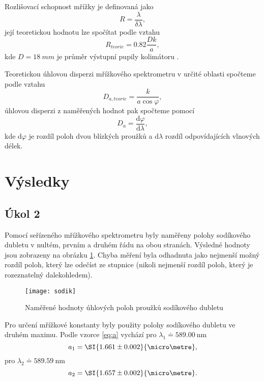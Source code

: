 \documentclass{protokol}
\begin{document}
    Rozlišovací schopnost mřížky je definovaná jako 
    \begin{equation}
      R = \frac{\lambda}{\delta \lambda},
    \end{equation}
    její teoretickou hodnotu lze spočítat podle vztahu
    \begin{equation} \label{eq:R_teorie}
      R_{teorie} = \num{0.82} \frac{D k}{a},
    \end{equation}
    kde $D = \SI{18}{mm}$ je průměr výstupní pupily kolimátoru \cite{pokyny}.

    Teoretickou úhlovou disperzi mřížkového spektrometru v určité oblasti spočteme podle vztahu
    \begin{equation} \label{eq:disperze_teorie}
      D_{a, teorie} = \frac{k}{a \cos \varphi},
    \end{equation}
    úhlovou disperzi z naměřených hodnot pak spočteme pomocí
    \begin{equation} \label{eq:disperze}
      D_a = \frac{\mathrm{d}\varphi}{\mathrm{d}\lambda},
    \end{equation}
    kde $\mathrm{d}\varphi$ je rozdíl poloh dvou blízkých proužků a $\mathrm{d}\lambda$ rozdíl odpovídajících vlnových délek.

  \section*{Výsledky}

    \subsection*{Úkol 2}

      Pomocí seřízeného mřížkového spektrometru byly naměřeny polohy sodíkového dubletu v nultém, prvním a druhém řádu na obou stranách. Výsledné hodnoty jsou zobrazeny na obrázku \ref{fig:sodik}. Chyba měření byla odhadnuta jako nejmenší možný rozdíl poloh, který lze odečíst ze stupnice (nikoli nejmenší rozdíl poloh, který je rozeznatelný dalekohledem).

      \begin{figure}[H]
        \centering
        \texttt{[image: sodik]}
        \caption{Naměřené hodnoty úhlových poloh proužků  sodíkového dubletu} 
        \label{fig:sodik}
      \end{figure}
 
      Pro určení mřížkové konstanty byly použity polohy sodíkového dubletu ve druhém maximu. Podle vzorce \eqref{eq:a} vychází pro $\lambda_1 \doteq \SI{589.00}{\nano\metre}$
      $$ a_1 = \SI{1.661 \pm 0.002}{\micro\metre}, $$
      pro $\lambda_2 \doteq \SI{589.59}{\nano\metre}$
      $$ a_2 = \SI{1.657 \pm 0.002}{\micro\metre}. $$
\end{document}
